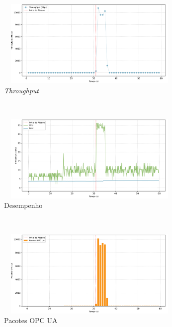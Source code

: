 \begin{apendicesenv}
\begin{figure}[htbp!]
    \centering
    \caption{\label{fig:1-dos_function_call_null_deref}Gráficos do ataque de DoS por desreferenciação de ponteiro nulo - nível de segurança: `Sign'.}
    \begin{subfigure}[t]{0.5\textwidth}
        \centering
        \caption{\textit{Throughput}}
        \includegraphics[width=1\textwidth, height=120pt]{USPSC-img/output/cropped/1-dos_function_call_null_deref-tput.png}
    \end{subfigure}%
    ~ 
    \begin{subfigure}[t]{0.5\textwidth}
        \centering
        \caption{Desempenho}
        \includegraphics[width=1\textwidth, height=120pt]{USPSC-img/output/cropped/1-dos_function_call_null_deref-perf.png}
    \end{subfigure}%
    \\
    \begin{subfigure}[t]{0.5\textwidth}
        \centering
        \caption{Pacotes OPC UA}
        \includegraphics[width=1\textwidth, height=120pt]{USPSC-img/output/cropped/1-dos_function_call_null_deref-pack.png}
    \end{subfigure}%
    ~
    \begin{subfigure}[t]{0.5\textwidth}

\end{subfigure}
\end{figure}
\end{apendicesenv}
